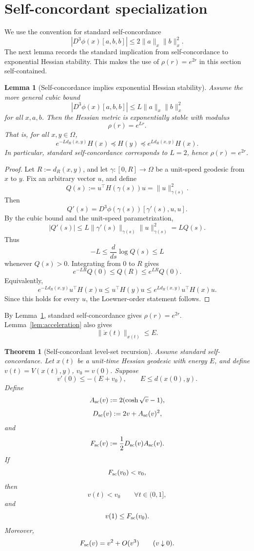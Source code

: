 \documentclass[11pt]{article}
\newtheorem{theorem}{Theorem}
\newtheorem{lemma}{Lemma}
\begin{document}
\section{Self-concordant specialization}

We use the convention for standard self-concordance
\[
    |D^3\phi(x)[a,b,b]|
    \le
    2\|a\|_x\|b\|_x^2.
\]
The next lemma records the standard implication from self-concordance to
exponential Hessian stability. This makes the use of \(\rho(r)=e^{2r}\) in this
section self-contained.

\begin{lemma}[Self-concordance implies exponential Hessian stability]\label{lem:sc-to-stability}
Assume the more general cubic bound
\[
    |D^3\phi(x)[a,b,b]|
    \le
    L\|a\|_x\|b\|_x^2
\]
for all \(x,a,b\). Then the Hessian metric is exponentially stable with modulus
\[
    \rho(r)=e^{Lr}.
\]
That is, for all \(x,y\in\Omega\),
\[
    e^{-Ld_R(x,y)}H(x)
    \preceq
    H(y)
    \preceq
    e^{Ld_R(x,y)}H(x).
\]
In particular, standard self-concordance corresponds to \(L=2\), hence
\(\rho(r)=e^{2r}\).
\end{lemma}

\begin{proof}
Let \(R:=d_R(x,y)\), and let \(\gamma:[0,R]\to\Omega\) be a unit-speed
geodesic from \(x\) to \(y\). Fix an arbitrary vector \(u\), and define
\[
    Q(s):=u^\top H(\gamma(s))u=\|u\|_{\gamma(s)}^2.
\]
Then
\[
    Q'(s)=D^3\phi(\gamma(s))[\gamma'(s),u,u].
\]
By the cubic bound and the unit-speed parametrization,
\[
    |Q'(s)|
    \le
    L\|\gamma'(s)\|_{\gamma(s)}\|u\|_{\gamma(s)}^2
    =LQ(s).
\]
Thus
\[
    -L\le \frac{d}{ds}\log Q(s)\le L
\]
whenever \(Q(s)>0\). Integrating from \(0\) to \(R\) gives
\[
    e^{-LR}Q(0)\le Q(R)\le e^{LR}Q(0).
\]
Equivalently,
\[
    e^{-Ld_R(x,y)}u^\top H(x)u
    \le
    u^\top H(y)u
    \le
    e^{Ld_R(x,y)}u^\top H(x)u.
\]
Since this holds for every \(u\), the Loewner-order statement follows.
\end{proof}

By Lemma~\ref{lem:sc-to-stability}, standard self-concordance gives
\(\rho(r)=e^{2r}\). Lemma~\ref{lem:acceleration} also gives
\[
    \|\ddot x(t)\|_{x(t)}\le E.
\]

\begin{theorem}[Self-concordant level-set recursion]\label{thm:sc-recursion}
Assume standard self-concordance. Let \(x(t)\) be a unit-time Hessian geodesic with energy \(E\), and define \(v(t)=V(x(t),y)\), \(v_0=v(0)\). Suppose
\[
    v'(0)\le -(E+v_0),
    \qquad
    E\le d(x(0),y).
\]
Define
\[
    A_{\rm sc}(v):=2(\cosh\sqrt v-1),
\]
\[
    D_{\rm sc}(v):=2v+A_{\rm sc}(v)^2,
\]
and
\[
    F_{\rm sc}(v):=\frac12D_{\rm sc}(v)A_{\rm sc}(v).
\]
If
\[
    F_{\rm sc}(v_0)<v_0,
\]
then
\[
    v(t)<v_0\qquad\forall t\in(0,1],
\]
and
\[
    v(1)\le F_{\rm sc}(v_0).
\]
Moreover,
\[
    F_{\rm sc}(v)=v^2+O(v^3)
    \qquad (v\downarrow0).
\]
\end{theorem}
\end{document}
